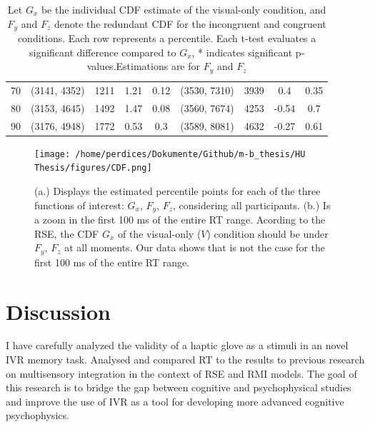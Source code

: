 \documentclass[12pt,oneside,openright]{report}
\begin{document}
\begin{table}[!ht]
{\begin{tabular}{ccccccccc}
    70 & (3141, 4352) & 1211 & 1.21 & 0.12 & (3530, 7310) & 3939 & 0.4 & 0.35 \\
    80 & (3153, 4645) & 1492 & 1.47 & 0.08 & (3560, 7674) & 4253 & -0.54 & 0.7 \\
    90 & (3176, 4948) & 1772 & 0.53 & 0.3 & (3589, 8081) & 4632 & -0.27 & 0.61 \\ \hline
    \end{tabular}}
    \caption{Let $G_x$ be the individual CDF estimate of the visual-only condition, and $F_y$ and $F_z$ denote the redundant CDF for the incongruent and congruent conditions. Each row represents a percentile. Each t-test evaluates a significant difference compared to $G_x$, * indicates significant p-values.Estimations are for $F_y$ and $F_z$}
    \label{tab:response-time-range}
\end{table}


\begin{figure}[!ht]
    \centering
    \texttt{[image: /home/perdices/Dokumente/Github/m-b\_thesis/HU Thesis/figures/CDF.png]}
    \caption{ (a.) Displays the estimated percentile points for each of the three functions of interest: $G_x$, $F_y$, $F_z$, considering all participants. (b.) Is a zoom in the first 100 ms of the entire RT range. Acording to the RSE, the CDF $G_x$ of the visual-only ($V$) condition should be under $F_y$, $F_z$ at all moments. Our data shows that is not the case for the first 100 ms of the entire RT range.}
    \label{fig:CDF}
\end{figure}


\section*{Discussion}

I have carefully analyzed the validity of a haptic glove as a stimuli in an novel IVR memory task. Analysed and compared RT to the results to previous research on multisensory integration in the context of RSE and RMI models. The goal of this research is to bridge the gap between cognitive and psychophysical studies and improve the use of IVR as a tool for developing more advanced cognitive psychophysics.
\end{document}
